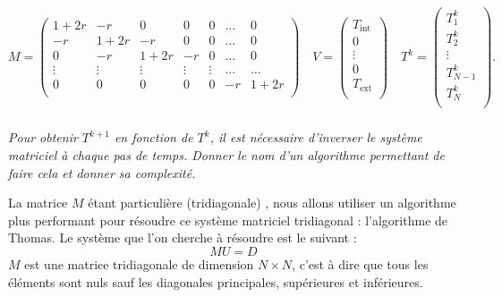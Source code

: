 $$
M = 
\begin{pmatrix}
1+2r & -r     & 0 & 0 & 0 &  \ldots & 0 \\
-r     & 1+2r & -r & 0 & 0  & \ldots &  0 \\
0    & -r & 1+2r & -r & 0   & \ldots&  0 \\
\vdots & \vdots & \vdots & \vdots & \vdots & \ldots & \ldots \\
0& 0& 0& 0& 0& -r & 1+2r\\
\end{pmatrix}
\quad 
V = \begin{pmatrix}
T_{\text{int}} \\
0 \\
\vdots \\
0 \\
T_{\text{ext}} \\
\end{pmatrix}
\quad 
T^k = \begin{pmatrix}
T_1^k \\
T_2^k  \\
\vdots \\
T_{N-1}^k  \\
T_N^k \\
\end{pmatrix}.
$$



\subparagraph{}
\textit{Pour obtenir $T^{k+1}$ en fonction de $T^{k}$, il est nécessaire d'inverser le 
système matriciel à chaque pas de temps.
Donner le nom d'un algorithme permettant de faire cela et donner sa complexité.}


\begin{obj}
La matrice $M$ étant particulière (tridiagonale) , nous allons utiliser un algorithme plus 
performant pour résoudre ce système matriciel tridiagonal : l'algorithme de Thomas.
 Le système que l'on cherche à résoudre est le suivant : 
$$
M U = D 
$$
$M$ est une matrice tridiagonale de dimension $N\times N$, c'est à dire que tous les éléments 
sont nuls sauf les diagonales principales, supérieures et inférieures. 
\end{obj}

